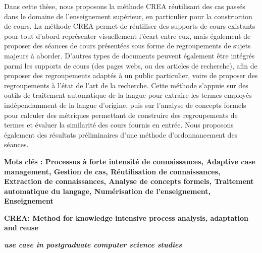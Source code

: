 \begin{footnotesize}
Dans cette thèse, nous proposons la méthode CREA réutilisant des cas passés dans le domaine de l'enseignement supérieur, en particulier pour la construction de cours.
La méthode CREA permet de réutiliser des supports de cours existants pour tout d'abord représenter visuellement l'écart entre eux, mais également de proposer des séances de cours présentées sous forme de regroupements de sujets majeurs à aborder.
D'autres types de documents peuvent également être intégrés parmi les supports de cours (des pages webs, ou des articles de recherche), afin de proposer des regroupements adaptés à un public particulier, voire de proposer des regroupements à l'état de l'art de la recherche.
Cette méthode s'appuie sur des outils de traitement automatique de la langue pour extraire les termes employés indépendamment de la langue d'origine, puis sur l'analyse de concepts formels pour calculer des métriques permettant de construire des regroupements de termes et évaluer la similarité des cours fournis en entrée.
Nous proposons également des résultats préliminaires d'une méthode d'ordonnancement des séances.



\medskip

\textbf{Mots clés :
Processus à forte intensité de connaissances,
Adaptive case management,
Gestion de cas,
Réutilisation de connaissances,
Extraction de connaissances,
Analyse de concepts formels,
Traitement automatique du langage,
Numérisation de l'enseignement,
Enseignement}


\bigskip


\shorthandoff{:} %

\begin{center}

\textbf{CREA: Method for knowledge intensive process analysis, adaptation and reuse}

\textbf{\textit{use case in postgraduate computer science studies}}

\end{center}


\end{footnotesize}
